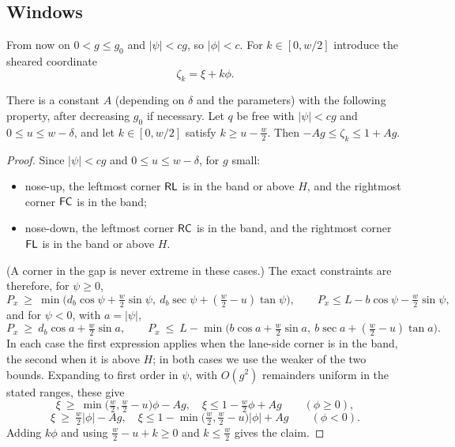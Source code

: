 \subsection{Windows}
From now on $0<g\le g_0$ and $|\psi|<cg$, so $|\phi|<c$.
For $k\in[0,w/2]$ introduce the sheared coordinate
\[
  \zeta_k=\xi+k\phi .
\]
\begin{lemma}[windows]\label{lem:windows}
There is a constant $A$ (depending on $\delta$ and the parameters) with the following property, after decreasing $g_0$ if necessary.
Let $q$ be free with $|\psi|<cg$ and $0\le u\le w-\delta$, and let $k\in[0,w/2]$ satisfy $k\ge u-\tfrac w2$.
Then $-Ag\le\zeta_k\le1+Ag$.
\end{lemma}

\begin{proof}
Since $|\psi|<cg$ and $0\le u\le w-\delta$, for $g$ small:
\begin{itemize}[nosep]
\item nose-up, the leftmost corner $\mathsf{RL}$ is in the band or above $H$, and the rightmost corner $\mathsf{FC}$ is in the band;
\item nose-down, the leftmost corner $\mathsf{RC}$ is in the band, and the rightmost corner $\mathsf{FL}$ is in the band or above $H$.
\end{itemize}
(A corner in the gap is never extreme in these cases.)
The exact constraints are therefore, for $\psi\ge0$,
\[
  P_x\ \ge\ \min\big(d_b\cos\psi+\tfrac w2\sin\psi,\ d_b\sec\psi+(\tfrac w2-u)\tan\psi\big),\qquad P_x\le L-b\cos\psi-\tfrac w2\sin\psi,
\]
and for $\psi<0$, with $a=|\psi|$,
\[
  P_x\ \ge\ d_b\cos a+\tfrac w2\sin a,\qquad P_x\ \le\ L-\min\big(b\cos a+\tfrac w2\sin a,\ b\sec a+(\tfrac w2-u)\tan a\big).
\]
In each case the first expression applies when the lane-side corner is in the band, the second when it is above $H$; in both cases we use the weaker of the two bounds.
Expanding to first order in $\psi$, with $O(g^2)$ remainders uniform in the stated ranges, these give
\[
  \xi\ \ge\ \min\big(\tfrac w2,\tfrac w2-u\big)\phi-Ag,\quad \xi\le1-\tfrac w2\phi+Ag\qquad(\phi\ge0),
\]
\[
  \xi\ \ge\ \tfrac w2|\phi|-Ag,\quad \xi\le1-\min\big(\tfrac w2,\tfrac w2-u\big)|\phi|+Ag\qquad(\phi<0).
\]
Adding $k\phi$ and using $\tfrac w2-u+k\ge0$ and $k\le\tfrac w2$ gives the claim.
\end{proof}

